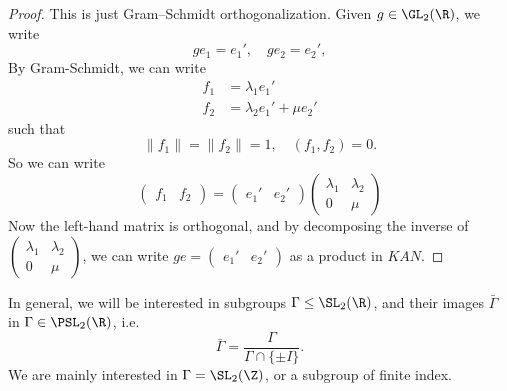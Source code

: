\documentclass[a4paper]{article}
\begin{document}
\begin{proof}
  This is just Gram--Schmidt orthogonalization. Given $g \in \GL_2(\R)$, we write
  \[
    g e_1 = e_1',\quad g e_2 = e_2',
  \]
  By Gram-Schmidt, we can write
  \begin{align*}
    f_1 &= \lambda_1 e_1'\\
    f_2 &= \lambda_2 e_1' + \mu e_2'
  \end{align*}
  such that
  \[
    \|f_1\| = \|f_2\| = 1,\quad (f_1, f_2) = 0.
  \]
  So we can write
  \[
    \begin{pmatrix}
      f_1 & f_2
    \end{pmatrix} =
    \begin{pmatrix}
      e_1' & e_2'
    \end{pmatrix}
    \begin{pmatrix}
      \lambda_1 & \lambda_2\\
      0 & \mu
    \end{pmatrix}
  \]
  Now the left-hand matrix is orthogonal, and by decomposing the inverse of $\begin{pmatrix} \lambda_1 & \lambda_2\\0 & \mu\end{pmatrix}$, we can write $ge = \begin{pmatrix}e_1' & e_2'\end{pmatrix}$ as a product in $KAN$.
\end{proof}
In general, we will be interested in subgroups $\Gamma \leq\SL_2(\R)$, and their images $\bar\Gamma$ in $\Gamma \in \PSL_2(\R)$, i.e.
\[
  \bar\Gamma = \frac{\Gamma}{\Gamma \cap \{\pm I\}}.
\]
We are mainly interested in $\Gamma = \SL_2(\Z)$, or a subgroup of finite index.
\end{document}

